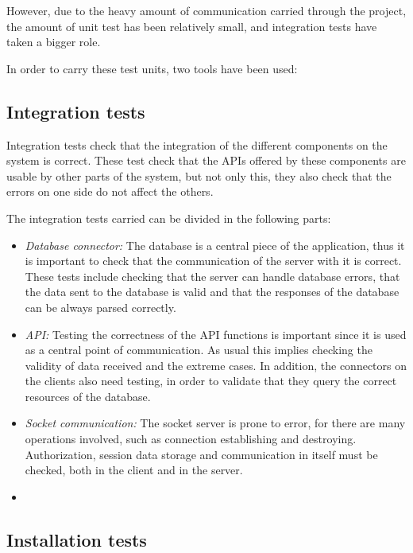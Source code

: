 However, due to the heavy amount of communication carried through the project, the amount of unit test has been relatively small, and integration tests have taken a bigger role.

In order to carry these test units, two tools have been used:

\subsection{Integration tests}

Integration tests check that the integration of the different components on the system is correct. These test check that the APIs offered by these components are usable by other parts of the system, but not only this, they also check that the errors on one side do not affect the others.

The integration tests carried can be divided in the following parts:

\begin{itemize}
\item \textit{Database connector:} The database is a central piece of the application, thus it is important to check that the communication of the server with it is correct. These tests include checking that the server can handle database errors, that the data sent to the database is valid and that the responses of the database can be always parsed correctly.

\item \textit{API:} Testing the correctness of the API functions is important since it is used as a central point of communication. As usual this implies checking the validity of data received and the extreme cases. In addition, the connectors on the clients also need testing, in order to validate that they query the correct resources of the database.

\item \textit{Socket communication:} The socket server is prone to error, for there are many operations involved, such as connection establishing and destroying. Authorization, session data storage and communication in itself must be checked, both in the client and in the server.
\item 
\end{itemize}

\subsection{Installation tests}

